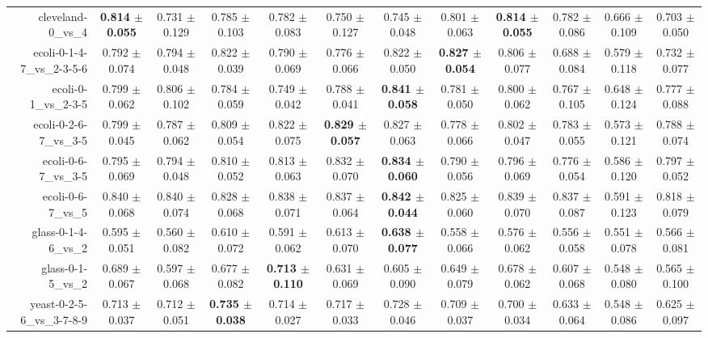 \begin{table}[!ht]
{\begin{tabular}{r c c c c c c c c c c c}
cleveland-0\_vs\_4 & \textbf{0.814 $\pm$ 0.055} & 0.731 $\pm$ 0.129 & 0.785 $\pm$ 0.103 & 0.782 $\pm$ 0.083 & 0.750 $\pm$ 0.127 & 0.745 $\pm$ 0.048 & 0.801 $\pm$ 0.063 & \textbf{0.814 $\pm$ 0.055} & 0.782 $\pm$ 0.086 & 0.666 $\pm$ 0.109 & 0.703 $\pm$ 0.050 \\
ecoli-0-1-4-7\_vs\_2-3-5-6 & 0.792 $\pm$ 0.074 & 0.794 $\pm$ 0.048 & 0.822 $\pm$ 0.039 & 0.790 $\pm$ 0.069 & 0.776 $\pm$ 0.066 & 0.822 $\pm$ 0.050 & \textbf{0.827 $\pm$ 0.054} & 0.806 $\pm$ 0.077 & 0.688 $\pm$ 0.084 & 0.579 $\pm$ 0.118 & 0.732 $\pm$ 0.077 \\
ecoli-0-1\_vs\_2-3-5 & 0.799 $\pm$ 0.062 & 0.806 $\pm$ 0.102 & 0.784 $\pm$ 0.059 & 0.749 $\pm$ 0.042 & 0.788 $\pm$ 0.041 & \textbf{0.841 $\pm$ 0.058} & 0.781 $\pm$ 0.050 & 0.800 $\pm$ 0.062 & 0.767 $\pm$ 0.105 & 0.648 $\pm$ 0.124 & 0.777 $\pm$ 0.088 \\
ecoli-0-2-6-7\_vs\_3-5 & 0.799 $\pm$ 0.045 & 0.787 $\pm$ 0.062 & 0.809 $\pm$ 0.054 & 0.822 $\pm$ 0.075 & \textbf{0.829 $\pm$ 0.057} & 0.827 $\pm$ 0.063 & 0.778 $\pm$ 0.066 & 0.802 $\pm$ 0.047 & 0.783 $\pm$ 0.055 & 0.573 $\pm$ 0.121 & 0.788 $\pm$ 0.074 \\
ecoli-0-6-7\_vs\_3-5 & 0.795 $\pm$ 0.069 & 0.794 $\pm$ 0.048 & 0.810 $\pm$ 0.052 & 0.813 $\pm$ 0.063 & 0.832 $\pm$ 0.070 & \textbf{0.834 $\pm$ 0.060} & 0.790 $\pm$ 0.056 & 0.796 $\pm$ 0.069 & 0.776 $\pm$ 0.054 & 0.586 $\pm$ 0.120 & 0.797 $\pm$ 0.052 \\
ecoli-0-6-7\_vs\_5 & 0.840 $\pm$ 0.068 & 0.840 $\pm$ 0.074 & 0.828 $\pm$ 0.068 & 0.838 $\pm$ 0.071 & 0.837 $\pm$ 0.064 & \textbf{0.842 $\pm$ 0.044} & 0.825 $\pm$ 0.060 & 0.839 $\pm$ 0.070 & 0.837 $\pm$ 0.087 & 0.591 $\pm$ 0.123 & 0.818 $\pm$ 0.079 \\
glass-0-1-4-6\_vs\_2 & 0.595 $\pm$ 0.051 & 0.560 $\pm$ 0.082 & 0.610 $\pm$ 0.072 & 0.591 $\pm$ 0.062 & 0.613 $\pm$ 0.070 & \textbf{0.638 $\pm$ 0.077} & 0.558 $\pm$ 0.066 & 0.576 $\pm$ 0.062 & 0.556 $\pm$ 0.058 & 0.551 $\pm$ 0.078 & 0.566 $\pm$ 0.081 \\
glass-0-1-5\_vs\_2 & 0.689 $\pm$ 0.067 & 0.597 $\pm$ 0.068 & 0.677 $\pm$ 0.082 & \textbf{0.713 $\pm$ 0.110} & 0.631 $\pm$ 0.069 & 0.605 $\pm$ 0.090 & 0.649 $\pm$ 0.079 & 0.678 $\pm$ 0.062 & 0.607 $\pm$ 0.068 & 0.548 $\pm$ 0.080 & 0.565 $\pm$ 0.100 \\
yeast-0-2-5-6\_vs\_3-7-8-9 & 0.713 $\pm$ 0.037 & 0.712 $\pm$ 0.051 & \textbf{0.735 $\pm$ 0.038} & 0.714 $\pm$ 0.027 & 0.717 $\pm$ 0.033 & 0.728 $\pm$ 0.046 & 0.709 $\pm$ 0.037 & 0.700 $\pm$ 0.034 & 0.633 $\pm$ 0.064 & 0.548 $\pm$ 0.086 & 0.625 $\pm$ 0.097 \\

\end{tabular}}
\end{table}
